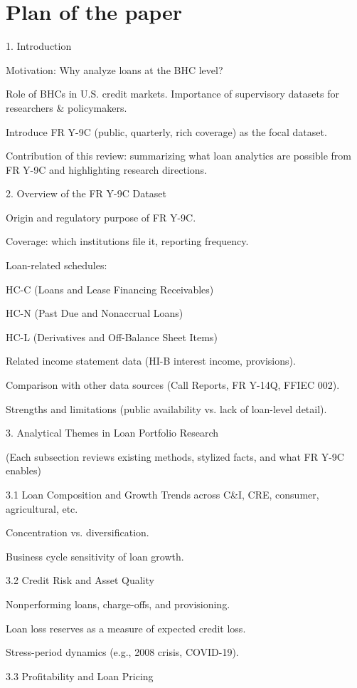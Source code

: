\documentclass[conference]{IEEEtran}
\begin{document}
	
	
\section{Plan of the paper}
1. Introduction

Motivation: Why analyze loans at the BHC level?

Role of BHCs in U.S. credit markets.
Importance of supervisory datasets for researchers \& policymakers.

Introduce FR Y-9C (public, quarterly, rich coverage) as the focal dataset.

Contribution of this review: summarizing what loan analytics are possible from FR Y-9C and highlighting research directions.

2. Overview of the FR Y-9C Dataset

Origin and regulatory purpose of FR Y-9C.

Coverage: which institutions file it, reporting frequency.

Loan-related schedules:

HC-C (Loans and Lease Financing Receivables)

HC-N (Past Due and Nonaccrual Loans)

HC-L (Derivatives and Off-Balance Sheet Items)

Related income statement data (HI-B interest income, provisions).

Comparison with other data sources (Call Reports, FR Y-14Q, FFIEC 002).

Strengths and limitations (public availability vs. lack of loan-level detail).

3. Analytical Themes in Loan Portfolio Research

(Each subsection reviews existing methods, stylized facts, and what FR Y-9C enables)

3.1 Loan Composition and Growth
Trends across C\&I, CRE, consumer, agricultural, etc.

Concentration vs. diversification.

Business cycle sensitivity of loan growth.

3.2 Credit Risk and Asset Quality

Nonperforming loans, charge-offs, and provisioning.

Loan loss reserves as a measure of expected credit loss.

Stress-period dynamics (e.g., 2008 crisis, COVID-19).

3.3 Profitability and Loan Pricing
\end{document}
